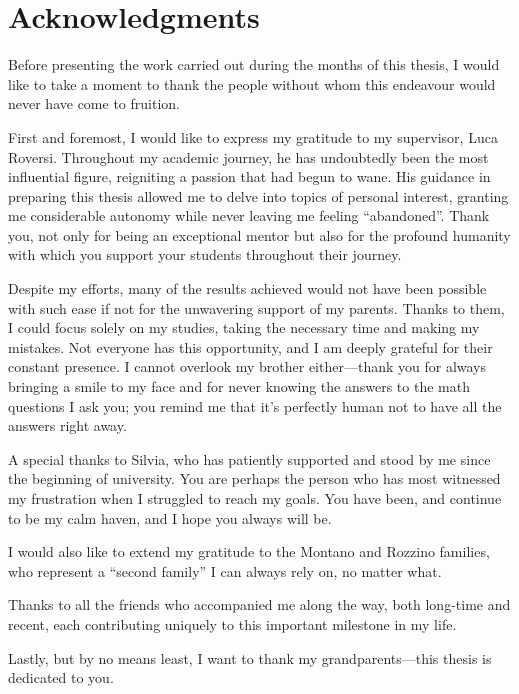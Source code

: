 \section*{Acknowledgments}

Before presenting the work carried out during the months of this thesis, I would like to take a moment to thank the people without whom this endeavour would never have come to fruition.

First and foremost, I would like to express my gratitude to my supervisor, Luca Roversi. 
Throughout my academic journey, he has undoubtedly been the most influential figure, reigniting a passion that had begun to wane. 
His guidance in preparing this thesis allowed me to delve into topics of personal interest, granting me considerable autonomy while never leaving me feeling ``abandoned''. 
Thank you, not only for being an exceptional mentor but also for the profound humanity with which you support your students throughout their journey.

Despite my efforts, many of the results achieved would not have been possible with such ease if not for the unwavering support of my parents. 
Thanks to them, I could focus solely on my studies, taking the necessary time and making my mistakes. 
Not everyone has this opportunity, and I am deeply grateful for their constant presence. 
I cannot overlook my brother either—thank you for always bringing a smile to my face and for never knowing the answers to the math questions I ask you; you remind me that it's perfectly human not to have all the answers right away.

A special thanks to Silvia, who has patiently supported and stood by me since the beginning of university. 
You are perhaps the person who has most witnessed my frustration when I struggled to reach my goals. 
You have been, and continue to be my calm haven, and I hope you always will be.

I would also like to extend my gratitude to the Montano and Rozzino families, who represent a ``second family'' I can always rely on, no matter what.

Thanks to all the friends who accompanied me along the way, both long-time and recent, each contributing uniquely to this important milestone in my life.

Lastly, but by no means least, I want to thank my grandparents—this thesis is dedicated to you.